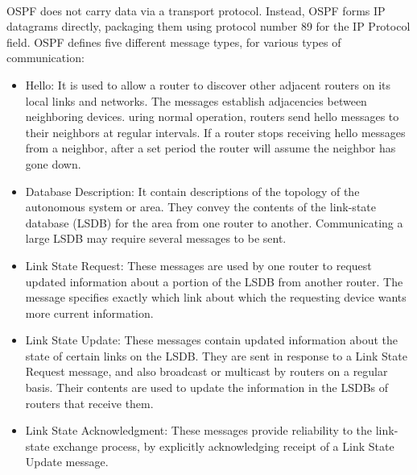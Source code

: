 \paragraph{}OSPF does not carry data via a transport protocol. Instead, OSPF forms IP datagrams directly, packaging them using protocol number 89 for the IP Protocol field. OSPF defines five different message types, for various types of communication:
\begin{itemize}
\item Hello: It is used to allow a router to discover other adjacent routers on its local links and networks. The messages establish adjacencies between neighboring devices. uring normal operation, routers send hello messages to their neighbors at regular intervals. If a router stops receiving hello messages from a neighbor, after a set period the router will assume the neighbor has gone down.
\item Database Description: It contain descriptions of the topology of the autonomous system or area.  They convey the contents of the link-state database (LSDB) for the area from one router to another. Communicating a large LSDB may require several messages to be sent.
\item Link State Request: These messages are used by one router to request updated information about a portion of the LSDB from another router. The message specifies exactly which link about which the requesting device wants more current information.
\item Link State Update: These messages contain updated information about the state of certain links on the LSDB. They are sent in response to a Link State Request message, and also broadcast or multicast by routers on a regular basis. Their contents are used to update the information in the LSDBs of routers that receive them.
\item Link State Acknowledgment: These messages provide reliability to the link-state exchange process, by explicitly acknowledging receipt of a Link State Update message.
\end{itemize}

